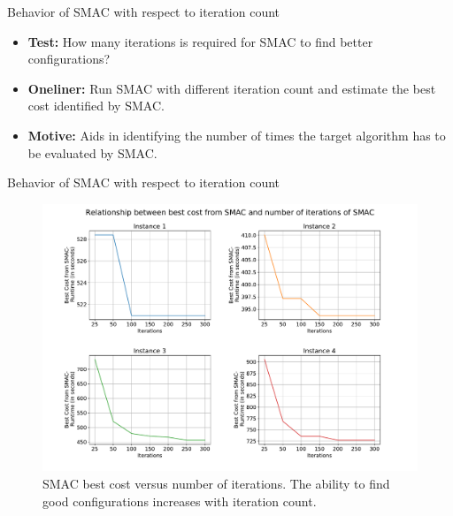 \documentclass[10pt]{beamer}
\begin{document}
\begin{frame}[t]{Behavior of SMAC with respect to iteration count}

\begin{itemize}
\item \textbf{Test:} How many iterations is required for SMAC to find better configurations? 
\newline
\item \textbf{Oneliner:} Run SMAC with different iteration count and estimate the best cost identified by SMAC. 
\newline
\item \textbf{Motive:} Aids in identifying the number of times the target algorithm has to be evaluated by SMAC.
\end{itemize}

\end{frame}

\begin{frame}{Behavior of SMAC with respect to iteration count}

\begin{figure}[!ht]
\centering
\includegraphics[width=0.8\linewidth, height=0.7\textheight]{images/Iteration_vs_cost.pdf}
\captionsetup{justification=justified}
\caption{SMAC best cost versus number of iterations. The ability to find good configurations increases with iteration count.}
\label{fig:experiment3_results}
\end{figure}

\end{frame}
\end{document}
